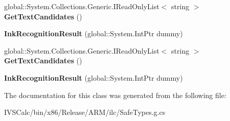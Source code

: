 \begin{DoxyCompactItemize}
global\+::\+System.\+Collections.\+Generic.\+I\+Read\+Only\+List$<$ string $>$ {\bfseries Get\+Text\+Candidates} ()
\item 
\mbox{\label{class_windows_1_1_u_i_1_1_input_1_1_inking_1_1_ink_recognition_result_a3b3845719108524a1e3e54bdf0f35e21}} 
{\bfseries Ink\+Recognition\+Result} (global\+::\+System.\+Int\+Ptr dummy)
\item 
\mbox{\label{class_windows_1_1_u_i_1_1_input_1_1_inking_1_1_ink_recognition_result_a160a774b2efd7084843759d066bd82f2}} 
global\+::\+System.\+Collections.\+Generic.\+I\+Read\+Only\+List$<$ string $>$ {\bfseries Get\+Text\+Candidates} ()
\item 
\mbox{\label{class_windows_1_1_u_i_1_1_input_1_1_inking_1_1_ink_recognition_result_a3b3845719108524a1e3e54bdf0f35e21}} 
{\bfseries Ink\+Recognition\+Result} (global\+::\+System.\+Int\+Ptr dummy)
\end{DoxyCompactItemize}


The documentation for this class was generated from the following file\+:\begin{DoxyCompactItemize}
\item 
I\+V\+S\+Calc/bin/x86/\+Release/\+A\+R\+M/ilc/Safe\+Types.\+g.\+cs\end{DoxyCompactItemize}
